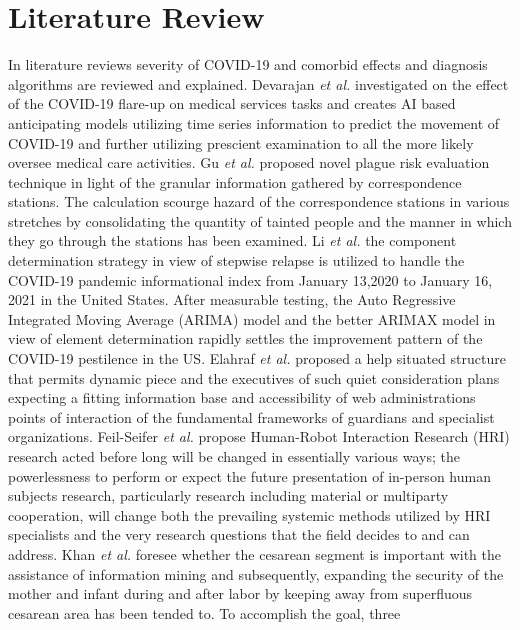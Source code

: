 \section{ Literature Review } 
In literature reviews severity of COVID-19 and comorbid effects and diagnosis algorithms are reviewed and 
explained. 
\newline 
Devarajan \emph{et al.} \cite {devarajan2021healthcare} investigated on the effect of the COVID-19 flare-up 
on medical services tasks and creates AI based anticipating models utilizing time series information to predict 
the movement of COVID-19 and further utilizing prescient examination to all the more likely oversee medical 
care activities. 
Gu \emph{et al.} \cite {gu2021epidemic} proposed novel plague risk evaluation technique in light of the 
granular information gathered by correspondence stations. The calculation scourge hazard of the 
correspondence stations in various stretches by consolidating the quantity of tainted people and the manner in 
which they go through the stations has been examined. 
Li \emph{et al.} \cite {li2021rapid} the component determination strategy in view of stepwise relapse is utilized 
to handle the COVID-19 pandemic informational index from January 13,2020 to January 16, 2021 in the United 
States. After measurable testing, the Auto Regressive Integrated Moving Average (ARIMA) model and the 
better ARIMAX model in view of element determination rapidly settles the improvement pattern of the 
COVID-19 pestilence in the US. 
Elahraf \emph{et al.} \cite {elahraf2021service} proposed a help situated structure that permits dynamic piece 
and the executives of such quiet consideration plans expecting a fitting information base and accessibility of 
web administrations points of interaction of the fundamental frameworks of guardians and specialist 
organizations. 
Feil-Seifer \emph{et al.} \cite {feil2020next} propose Human-Robot Interaction Research (HRI) research acted 
before long will be changed in essentially various ways; the powerlessness to perform or expect the future 
presentation of in-person human subjects research, particularly research including material or multiparty 
cooperation, will change both the prevailing systemic methods utilized by HRI specialists and the very research 
questions that the field decides to and can address. 
Khan \emph{et al.} \cite {khan2020prediction} foresee whether the cesarean segment is important with the 
assistance of information mining and subsequently, expanding the security of the mother and infant during and 
after labor by keeping away from superfluous cesarean area has been tended to. To accomplish the goal, three 
